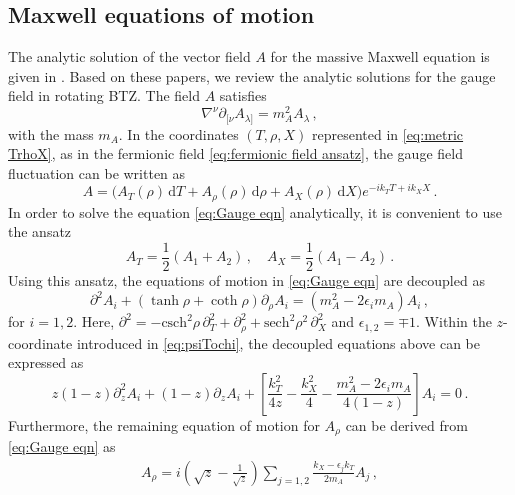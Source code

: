 \documentclass[11pt,a4paper]{article}
\newcommand{\td}{\text{d}}
\begin{document}
\subsection{Maxwell equations of motion}
The analytic solution of the vector field $A$ for the massive Maxwell equation is given in \cite{Das:1999pt, Birmingham:2001pj}. Based on these papers, we review the analytic solutions for the gauge field in rotating BTZ. The field $A$ satisfies
\begin{equation} \label{eq:Gauge eqn}
    \nabla^\nu\partial_{[\nu}A_{\lambda]}=m_A^2 A_{\lambda}\,,
\end{equation}
with the mass $m_A$. In the coordinates $(T, \rho, X)$ represented in \eqref{eq:metric TrhoX}, as in the fermionic field \eqref{eq:fermionic field ansatz}, the gauge field fluctuation can be written as 
\begin{equation} \label{eq:Gauge field ansatz}
    A = \Big( A_{T}(\rho) \, \td T + A_{\rho}(\rho) \, \td \rho + A_{X}(\rho) \, \td X \Big) e^{-i k_T T + i k_X X}\,.
\end{equation}
In order to solve the equation \eqref{eq:Gauge eqn} analytically, it is convenient to use the ansatz
\begin{equation} \label{eq:ATX}
    A_{T}=\frac{1}{2}\left(A_1 + A_2\right) \,, \quad A_{X}=\frac{1}{2}\left(A_1 - A_2\right)\,.
\end{equation}
Using this ansatz, the equations of motion in \eqref{eq:Gauge eqn} are decoupled as
\begin{equation}
    \partial^2 A_i + (\tanh{\rho} + \coth{\rho})\partial_{\rho}A_i = (m_A^2-2\epsilon_i m_A)A_i\,,
\end{equation}
for $i=1,2$. Here, $\partial^2=-\text{csch}^2{\rho} \, \partial_{T}^2+\partial_{\rho}^2+\text{sech}^2{\rho}^2 \, \partial_{X}^2$ and $\epsilon_{1,2}=\mp 1$. 
Within the $z$-coordinate introduced in \eqref{eq:psiTochi}, the decoupled equations above can be expressed as
\begin{equation} \label{eq:Decoupled Gauge eqn1}
    z(1-z)\partial_z^{2}A_i + (1-z)\partial_z A_i + \left[ \frac{k_T^2}{4z} - \frac{k_X^2}{4} - \frac{m_A^2-2\epsilon_i m_A}{4(1-z)} \right] A_i = 0\,.
\end{equation}
Furthermore, the remaining equation of motion for $A_\rho$ can be derived from \eqref{eq:Gauge eqn} as
\begin{equation} \label{eq:Arho}
\begin{aligned}
    A_\rho 
    = i\left( \sqrt{z} - \frac{1}{\sqrt{z}} \right) \sum_{j=1,2} \frac{k_X - \epsilon_j k_T}{2 m_A}A_j\,,
\end{aligned}
\end{equation}
\end{document}
